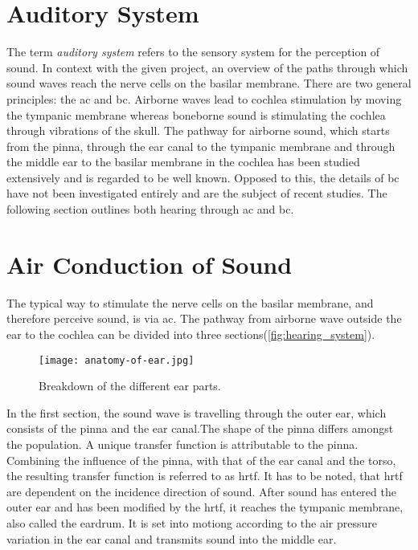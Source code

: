 \section{Auditory System}
The term \textit{auditory system} refers to the sensory system for the perception of sound. In context with the given project, an overview of the paths through which sound waves reach the nerve cells on the basilar membrane. There are two general principles: the \gls{ac} and \gls{bc}. Airborne waves lead to cochlea stimulation by moving the tympanic membrane whereas boneborne sound is stimulating the cochlea through vibrations of the skull. The pathway for airborne sound, which starts from the pinna, through the ear canal to the tympanic membrane and through the middle ear to the basilar membrane in the cochlea has been studied extensively and is regarded to be well known. Opposed to this, the details of \gls{bc} have not been investigated entirely \citep{stenfelt_2005} and are the subject of recent studies. The following section outlines both hearing through \gls{ac} and \gls{bc}.


\section{Air Conduction of Sound}
\label{sec:ear_functions}
The typical way to stimulate the nerve cells on the basilar membrane, and therefore perceive sound, is via \gls{ac}. The pathway from airborne wave outside the ear to the cochlea can be divided into three sections(\autoref{fig:hearing_system}). 
 \begin{figure}[H]
	\centering
		\texttt{[image: anatomy-of-ear.jpg]}
		\caption{Breakdown of the different ear parts.}
		\label{fig:hearing_system}
\end{figure}

In the first section, the sound wave is travelling through the outer ear, which consists of the pinna and the ear canal.The shape of the pinna differs amongst the population. A unique transfer function is attributable to the pinna. Combining the influence of the pinna, with that of the ear canal and the torso, the resulting transfer function is referred to as \gls{hrtf}. It has to be noted, that \gls{hrtf} are dependent on the incidence direction of sound.%
After sound has entered the outer ear and has been modified by the \gls{hrtf}, it reaches the tympanic membrane, also called the eardrum. It is set into motiong according to the air pressure variation in the ear canal and transmits sound into the middle ear.


